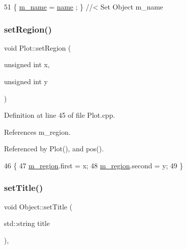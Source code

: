 \begin{DoxyCode}
51 \{ \hyperlink{classObject_a8b83c95c705d2c3ba0d081fe1710f48d}{m\_name}  = \hyperlink{classObject_a300f4c05dd468c7bb8b3c968868443c1}{name}  ; \} \textcolor{comment}{//< Set Object m\_name}
\end{DoxyCode}
\mbox{\label{classPlot_a77a015d72e98d6fb066481e9c70af1ec}} 
\subsubsection{\texorpdfstring{set\+Region()}{setRegion()}}
{\footnotesize\ttfamily void Plot\+::set\+Region (\begin{DoxyParamCaption}\item[{unsigned int}]{x,  }\item[{unsigned int}]{y }\end{DoxyParamCaption})}



Definition at line 45 of file Plot.\+cpp.



References m\+\_\+region.



Referenced by Plot(), and pos().


\begin{DoxyCode}
46                                         \{
47   \hyperlink{classPlot_aabcbba1cfc66babcbcd647fdf90cdbf1}{m\_region}.first  = x;
48   \hyperlink{classPlot_aabcbba1cfc66babcbcd647fdf90cdbf1}{m\_region}.second = y;
49 \}
\end{DoxyCode}
\mbox{\label{classObject_a89557dbbad5bcaa02652f5d7fa35d20f}} 
\subsubsection{\texorpdfstring{set\+Title()}{setTitle()}}
{\footnotesize\ttfamily void Object\+::set\+Title (\begin{DoxyParamCaption}\item[{std\+::string}]{title }\end{DoxyParamCaption})\hspace{0.3cm}{\ttfamily [inline]}, {\ttfamily [inherited]}}



